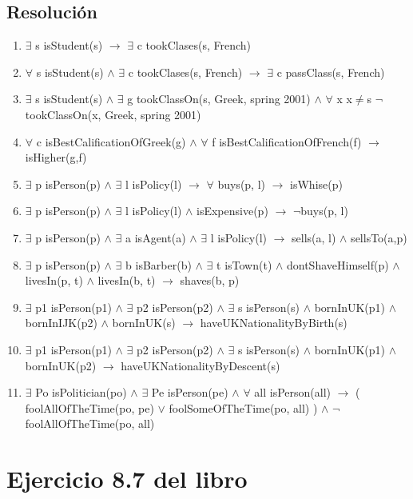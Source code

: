 \documentclass[a4paper,10pt]{article}
\begin{document}
\subsection{Resolución}
\begin{enumerate}
    \item $\exists$ s isStudent(s) $\rightarrow$ $\exists$ c tookClases(s, French)
	\item $\forall$ s isStudent(s) $\land$ $\exists$ c tookClases(s, French) $\rightarrow$ $\exists$ c passClass(s, French)
	\item $\exists$ s isStudent(s) $\land$ $\exists$ g tookClassOn(s, Greek, spring 2001) $\land$ $\forall$ x x$\neq$s $\neg$tookClassOn(x, Greek, spring 2001)
	\item $\forall$ c isBestCalificationOfGreek(g) $\land$ $\forall$ f isBestCalificationOfFrench(f) $\rightarrow$ isHigher(g,f)
	\item $\exists$ p isPerson(p) $\land$ $\exists$ l isPolicy(l) $\rightarrow$ $\forall$ buys(p, l) $\rightarrow$ isWhise(p)
	\item $\exists$ p isPerson(p) $\land$ $\exists$ l isPolicy(l) $\land$ isExpensive(p) $\rightarrow$ $\neg$buys(p, l)
	\item $\exists$ p isPerson(p) $\land$ $\exists$ a isAgent(a) $\land$ $\exists$ l isPolicy(l) $\rightarrow$ sells(a, l) $\land$ sellsTo(a,p)
	\item $\exists$ p isPerson(p) $\land$ $\exists$ b isBarber(b) $\land$ $\exists$ t isTown(t) $\land$ dontShaveHimself(p) $\land$ livesIn(p, t) $\land$ livesIn(b, t) $\rightarrow$ shaves(b, p)
	\item $\exists$ p1 isPerson(p1) $\land$ $\exists$ p2 isPerson(p2) $\land$ $\exists$ s isPerson(s) $\land$ bornInUK(p1) $\land$ bornInIJK(p2) $\land$ bornInUK(s) $\rightarrow$ haveUKNationalityByBirth(s)
	\item $\exists$ p1 isPerson(p1) $\land$ $\exists$ p2 isPerson(p2) $\land$ $\exists$ s isPerson(s) $\land$ bornInUK(p1) $\land$ bornInUK(p2) $\rightarrow$ haveUKNationalityByDescent(s)
	\item $\exists$ Po isPolitician(po) $\land$ $\exists$ Pe isPerson(pe) $\land$ $\forall$ all isPerson(all) $\rightarrow$ ( foolAllOfTheTime(po, pe) $\lor$ foolSomeOfTheTime(po, all) ) $\land$ $\lnot$ foolAllOfTheTime(po, all)
\end{enumerate}

\section{Ejercicio 8.7 del libro}
\end{document}
